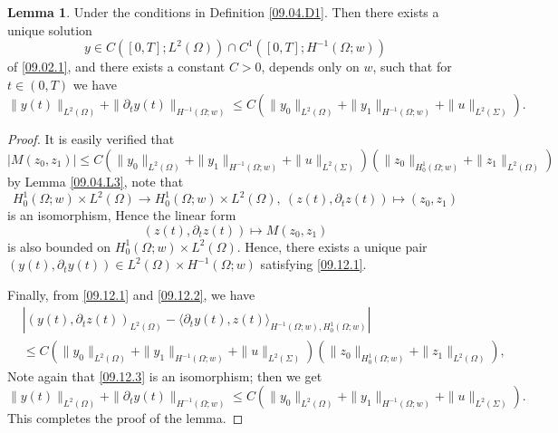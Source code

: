 \documentclass[preprint,12pt]{elsarticle}
\theoremstyle{definition}   %
\newtheorem{lemma}[theorem]{Lemma}
\numberwithin{equation}{section}
\def\pt{\partial}
\def\ra{\rightarrow}
\def\lg{\langle}
\def\rg{\rangle}
\def\pt{\partial}
\def\Om{\Omega}
\def\ts{\times}
\begin{document}
\begin{lemma}\label{09.04.L1}
	Under the conditions in Definition \ref{09.04.D1}. Then there exists a unique solution 
	\begin{equation*}
		y\in C([0,T]; L^2(\Om))\cap C^1([0,T]; H^{-1}(\Om;w))
	\end{equation*}
	of \eqref{09.02.1}, and there exists a constant $C>0$, depends only on $w$, such that for $t\in (0,T)$ we have 
	\begin{equation*}
		\|y(t)\|_{L^2(\Om)}+\|\pt_t y(t)\|_{H^{-1}(\Om;w)}\leq C\left(\|y_0\|_{L^2(\Om)}+\|y_1\|_{H^{-1}(\Om;w)}+\|u\|_{L^2(\Sigma)}\right). 
	\end{equation*} 
\end{lemma}

\begin{proof}
	It is easily verified that 
	\begin{equation}\label{09.12.2}
		|M(z_0,z_1)|\leq C\left(\|y_0\|_{L^2(\Om)}+\|y_1\|_{H^{-1}(\Om;w)}+\|u\|_{L^2(\Sigma)}\right)\left(\|z_0\|_{H_0^1(\Om;w)}+\|z_1\|_{L^2(\Om)}\right) 
	\end{equation}
	by Lemma \ref{09.04.L3}, note that 
	\begin{equation}\label{09.12.3}
		H_0^1(\Om;w)\ts L^2(\Om)\ra H_0^1(\Om;w)\ts L^2(\Om), \ (z(t), \pt_tz(t))\mapsto (z_0,z_1) 
	\end{equation}
	is an isomorphism, Hence the linear form 
	\begin{equation*}
		(z(t), \pt_tz(t))\mapsto M(z_0,z_1)
	\end{equation*}
	is also bounded on $H_0^1(\Om;w)\ts L^2(\Om)$. Hence, there exists a unique pair $(y(t), \pt_ty(t))\in L^2(\Om)\ts H^{-1}(\Om;w)$ satisfying \eqref{09.12.1}. 
	
	Finally, from \eqref{09.12.1} and \eqref{09.12.2}, we have 
	\begin{equation*}
		\begin{split}
			&\left|(y(t), \pt_t z(t))_{L^2(\Om)}-\lg \pt_ty(t), z(t)\rg_{H^{-1}(\Om;w), H_0^1(\Om;w)}\right|\\
			&\leq C\left(\|y_0\|_{L^2(\Om)}+\|y_1\|_{H^{-1}(\Om;w)}+\|u\|_{L^2(\Sigma)}\right)\left(\|z_0\|_{H_0^1(\Om;w)}+\|z_1\|_{L^2(\Om)}\right), 
		\end{split}
	\end{equation*}
	Note again that \eqref{09.12.3} is an isomorphism; then we get
	\begin{equation*}
		\|y(t)\|_{L^2(\Om)}+\|\pt_t y(t)\|_{H^{-1}(\Om;w)}\leq C\left(\|y_0\|_{L^2(\Om)}+\|y_1\|_{H^{-1}(\Om;w)}+\|u\|_{L^2(\Sigma)}\right). 
	\end{equation*} 
	This completes the proof of the lemma. 
\end{proof}
\end{document}

